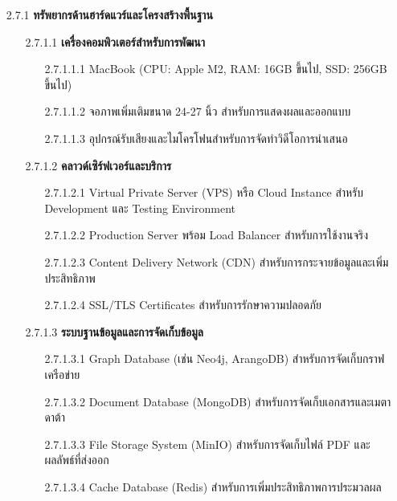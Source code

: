 \documentclass[12pt,a4paper]{article}
\begin{document}
\begin{enumerate}[leftmargin=2cm]
{        \begin{enumerate}
            \item[2.7.1] \textbf{ทรัพยากรด้านฮาร์ดแวร์และโครงสร้างพื้นฐาน}
            \begin{enumerate}
                \item[2.7.1.1] \textbf{เครื่องคอมพิวเตอร์สำหรับการพัฒนา}
                \begin{enumerate}
                    \item[2.7.1.1.1] MacBook (CPU: Apple M2, RAM: 16GB ขึ้นไป, SSD: 256GB ขึ้นไป)
                    \item[2.7.1.1.2] จอภาพเพิ่มเติมขนาด 24-27 นิ้ว สำหรับการแสดงผลและออกแบบ
                    \item[2.7.1.1.3] อุปกรณ์รับเสียงและไมโครโฟนสำหรับการจัดทำวิดีโอการนำเสนอ
                \end{enumerate}
                
                \item[2.7.1.2] \textbf{คลาวด์เซิร์ฟเวอร์และบริการ}
                \begin{enumerate}
                    \item[2.7.1.2.1] Virtual Private Server (VPS) หรือ Cloud Instance สำหรับ Development และ Testing Environment
                    \item[2.7.1.2.2] Production Server พร้อม Load Balancer สำหรับการใช้งานจริง
                    \item[2.7.1.2.3] Content Delivery Network (CDN) สำหรับการกระจายข้อมูลและเพิ่มประสิทธิภาพ
                    \item[2.7.1.2.4] SSL/TLS Certificates สำหรับการรักษาความปลอดภัย
                \end{enumerate}
                
                \item[2.7.1.3] \textbf{ระบบฐานข้อมูลและการจัดเก็บข้อมูล}
                \begin{enumerate}
                    \item[2.7.1.3.1] Graph Database (เช่น Neo4j, ArangoDB) สำหรับการจัดเก็บกราฟเครือข่าย
                    \item[2.7.1.3.2] Document Database (MongoDB) สำหรับการจัดเก็บเอกสารและเมตาดาต้า
                    \item[2.7.1.3.3] File Storage System (MinIO) สำหรับการจัดเก็บไฟล์ PDF และผลลัพธ์ที่ส่งออก
                    \item[2.7.1.3.4] Cache Database (Redis) สำหรับการเพิ่มประสิทธิภาพการประมวลผล
                \end{enumerate}
            \end{enumerate}


\end{enumerate}}
\end{enumerate}
\end{document}
